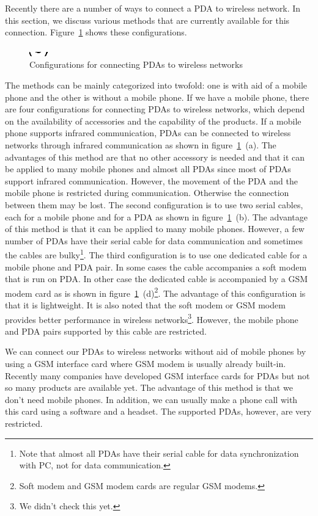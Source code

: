 Recently there are a number of ways to connect a PDA to wireless 
network. In this section, we discuss various methods that are 
currently available for this connection. 
Figure~\ref{pda_connections} shows these configurations. 
\begin{figure}
\centering
\includegraphics[scale=0.5,bb=28 408 573 821]{pda_connections.eps}
\caption{Configurations for connecting PDAs to wireless networks
\label{pda_connections}}
\end{figure}
The methods can be mainly categorized into twofold: one is with aid of
a mobile phone and the other is without a mobile phone. If we have a
mobile phone, there are four configurations for connecting PDAs to
wireless networks, which depend on the availability of accessories and
the capability of the products.  If a mobile phone supports infrared
communication, PDAs can be connected to wireless networks through
infrared communication as shown in
figure~\ref{pda_connections}~(a). The advantages of this method are
that no other accessory is needed and that it can be applied to many
mobile phones and almost all PDAs since most of PDAs support infrared
communication.  However, the movement of the PDA and the mobile phone
is restricted during communication.  Otherwise the connection between
them may be lost. The second configuration is to use two serial
cables, each for a mobile phone and for a PDA as shown in
figure~\ref{pda_connections}~(b). The advantage of this method is that
it can be applied to many mobile phones. However, a few number of PDAs
have their serial cable for data communication and sometimes the
cables are bulky\footnote{Note that almost all PDAs have their serial
  cable for data synchronization with PC, not for data
  communication.}. The third configuration is to use one dedicated
cable for a mobile phone and PDA pair. In some cases the cable
accompanies a soft modem that is run on PDA. In other case the
dedicated cable is accompanied by a GSM modem card as is shown in
figure~\ref{pda_connections}~(d)\footnote{Soft modem and GSM modem
  cards are regular GSM modems.}.  The advantage of this configuration
is that it is lightweight.  It is also noted that the soft modem or
GSM modem provides better performance in wireless networks\footnote{We
  didn't check this yet.}. However, the mobile phone and PDA pairs
supported by this cable are restricted.

We can connect our PDAs to wireless networks without aid of 
mobile phones by using a GSM interface card where GSM modem 
is usually already built-in. Recently many companies have 
developed GSM interface cards for PDAs but not so many 
products are available yet. The advantage of this method is 
that we don't need mobile phones. In addition, we can usually make 
a phone call with this card using a software and a headset. The 
supported PDAs, however, are very restricted. 

